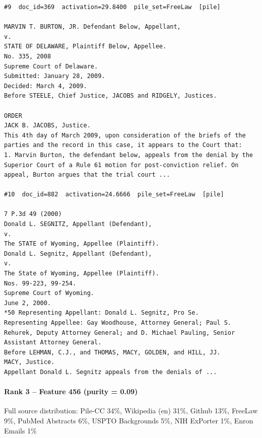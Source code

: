 \begin{verbatim}
#9  doc_id=369  activation=29.8400  pile_set=FreeLaw  [pile]

MARVIN T. BURTON, JR. Defendant Below, Appellant,
v.
STATE OF DELAWARE, Plaintiff Below, Appellee.
No. 335, 2008
Supreme Court of Delaware.
Submitted: January 28, 2009.
Decided: March 4, 2009.
Before STEELE, Chief Justice, JACOBS and RIDGELY, Justices.

ORDER
JACK B. JACOBS, Justice.
This 4th day of March 2009, upon consideration of the briefs of the parties and the record in this case, it appears to the Court that:
1. Marvin Burton, the defendant below, appeals from the denial by the Superior Court of a Rule 61 motion for post-conviction relief. On appeal, Burton argues that the trial court ...

#10  doc_id=882  activation=24.6666  pile_set=FreeLaw  [pile]

7 P.3d 49 (2000)
Donald L. SEGNITZ, Appellant (Defendant),
v.
The STATE of Wyoming, Appellee (Plaintiff).
Donald L. Segnitz, Appellant (Defendant),
v.
The State of Wyoming, Appellee (Plaintiff).
Nos. 99-223, 99-254.
Supreme Court of Wyoming.
June 2, 2000.
*50 Representing Appellant: Donald L. Segnitz, Pro Se.
Representing Appellee: Gay Woodhouse, Attorney General; Paul S. Rehurek, Deputy Attorney General; and D. Michael Pauling, Senior Assistant Attorney General.
Before LEHMAN, C.J., and THOMAS, MACY, GOLDEN, and HILL, JJ.
MACY, Justice.
Appellant Donald L. Segnitz appeals from the denials of ...

\end{verbatim}

\paragraph*{Rank 3 -- Feature 456 (purity = 0.09)}

Full source distribution: Pile-CC 34\%, Wikipedia (en) 31\%, Github 13\%, FreeLaw 9\%, PubMed Abstracts 6\%, USPTO Backgrounds 5\%, NIH ExPorter 1\%, Enron Emails 1\%

